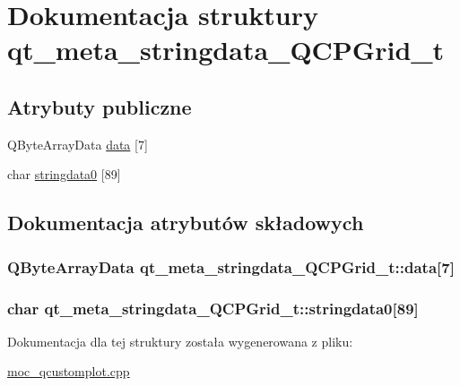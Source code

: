 \hypertarget{structqt__meta__stringdata___q_c_p_grid__t}{}\section{Dokumentacja struktury qt\+\_\+meta\+\_\+stringdata\+\_\+\+Q\+C\+P\+Grid\+\_\+t}
\label{structqt__meta__stringdata___q_c_p_grid__t}
\subsection*{Atrybuty publiczne}
\begin{DoxyCompactItemize}
\item 
Q\+Byte\+Array\+Data \hyperlink{structqt__meta__stringdata___q_c_p_grid__t_ad7520be1ee34a662890da1cb1384cf28}{data} \mbox{[}7\mbox{]}
\item 
char \hyperlink{structqt__meta__stringdata___q_c_p_grid__t_a125926539385574413c9ff82323a34ca}{stringdata0} \mbox{[}89\mbox{]}
\end{DoxyCompactItemize}


\subsection{Dokumentacja atrybutów składowych}
\subsubsection[{\texorpdfstring{data}{data}}]{\setlength{\rightskip}{0pt plus 5cm}Q\+Byte\+Array\+Data qt\+\_\+meta\+\_\+stringdata\+\_\+\+Q\+C\+P\+Grid\+\_\+t\+::data\mbox{[}7\mbox{]}}\hypertarget{structqt__meta__stringdata___q_c_p_grid__t_ad7520be1ee34a662890da1cb1384cf28}{}\label{structqt__meta__stringdata___q_c_p_grid__t_ad7520be1ee34a662890da1cb1384cf28}
\subsubsection[{\texorpdfstring{stringdata0}{stringdata0}}]{\setlength{\rightskip}{0pt plus 5cm}char qt\+\_\+meta\+\_\+stringdata\+\_\+\+Q\+C\+P\+Grid\+\_\+t\+::stringdata0\mbox{[}89\mbox{]}}\hypertarget{structqt__meta__stringdata___q_c_p_grid__t_a125926539385574413c9ff82323a34ca}{}\label{structqt__meta__stringdata___q_c_p_grid__t_a125926539385574413c9ff82323a34ca}


Dokumentacja dla tej struktury została wygenerowana z pliku\+:\begin{DoxyCompactItemize}
\item 
\hyperlink{moc__qcustomplot_8cpp}{moc\+\_\+qcustomplot.\+cpp}\end{DoxyCompactItemize}

